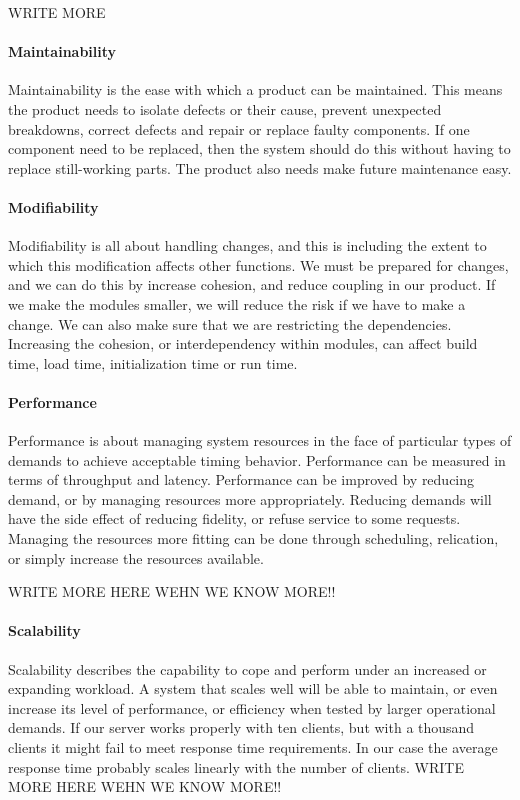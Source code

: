 WRITE MORE

\paragraph{Maintainability}
Maintainability is the ease with which a product can be maintained. This means the product needs to isolate defects or their cause, prevent unexpected breakdowns, correct defects and repair or replace faulty components. If one component need to be replaced, then the system should do this without having to replace still-working parts. The product also needs make future maintenance easy.

\paragraph{Modifiability}

Modifiability is all about handling changes, and this is including the extent to which this modification affects other functions. 
We must be prepared for changes, and we can do this  by increase cohesion, and reduce coupling in our product. 
If we make the modules smaller, we will reduce the risk if we have to make a change. 
We can also make sure that we are restricting the dependencies. 
Increasing the cohesion, or interdependency within modules, can affect build time, load time, initialization time or run time.

\paragraph{Performance}
Performance is about managing system resources in the face of particular types of demands to achieve acceptable timing behavior. 
Performance can be measured in terms of throughput and latency. 
Performance can be improved by reducing demand, or by managing resources more appropriately. 
Reducing demands will have the side effect of reducing fidelity, or refuse service to some requests. 
Managing the resources more fitting can be done through scheduling, relication, or simply increase the resources available.

WRITE MORE HERE WEHN WE KNOW MORE!!

\paragraph{Scalability}
 Scalability describes the capability to cope and perform under an increased or expanding workload. A system that scales well will be able to maintain, or even increase its level of performance, or efficiency when tested by larger operational demands.
 If our server works properly with ten clients, but with a thousand clients it might fail to meet response time requirements.
 In our case the average response time probably scales linearly with the number of clients.
 WRITE MORE HERE WEHN WE KNOW MORE!!

